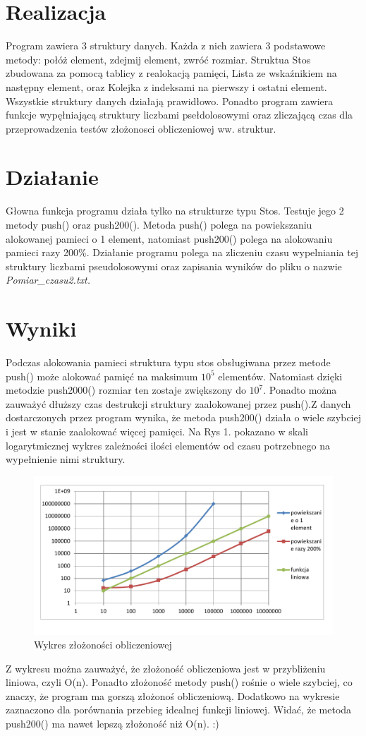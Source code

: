 \documentclass[twoside]{article}
\newcommand{\+}{\discretionary{\mbox{\scriptsize$\hookleftarrow$}}{}{}}
\begin{document}
\section{Realizacja}
Program zawiera 3 struktury danych. Każda z nich zawiera 3 podstawowe metody: połóż element, zdejmij element, zwróć rozmiar. Struktua Stos zbudowana za pomocą tablicy z realokacją pamięci, Lista ze wskaźnikiem na następny element, oraz Kolejka z indeksami na pierwszy i ostatni element. Wszystkie struktury danych działają prawidłowo.
Ponadto program zawiera funkcje wypęłniającą struktury liczbami psełdolosowymi oraz zliczającą czas dla przeprowadzenia testów złożonosci obliczeniowej ww. struktur.
\section{Działanie}
Głowna funkcja programu działa tylko na strukturze typu Stos. Testuje jego 2 metody push() oraz push200(). Metoda push() polega na powiekszaniu alokowanej pamieci o 1 element, natomiast push200() polega na alokowaniu pamieci razy 200\%. Działanie programu polega na zliczeniu czasu wypelniania tej struktury liczbami pseudolosowymi oraz zapisania wyników do pliku o nazwie \textsl{Pomiar\_czasu2.txt.}
\section{Wyniki}
Podczas alokowania pamieci struktura typu stos obsługiwana przez metode push() może alokować pamięć na maksimum $10^{5}$ elementów. Natomiast dzięki metodzie push2000() rozmiar ten zostaje zwiększony do $10^{7}$. Ponadto można zauważyć dłuższy czas destrukcji struktury zaalokowanej przez push().Z danych dostarczonych przez program wynika, że metoda push200() działa o wiele szybciej i jest w stanie zaalokować więcej pamięci. Na Rys 1. pokazano w skali logarytmicznej wykres zależności ilości elementów od czasu potrzebnego na wypełnienie nimi struktury.
\begin{figure}[h!]
\centering
\includegraphics[scale=0.7]{wykres1}
\caption{Wykres złożoności obliczeniowej}
\label{fig:wykres1}
\end{figure}
Z wykresu można zauważyć, że złożoność obliczeniowa jest w przybliżeniu liniowa, czyli O(n). Ponadto złożoność metody push() rośnie o wiele szybciej, co znaczy, że program ma gorszą złożonoś obliczeniową. Dodatkowo na wykresie zaznaczono dla porównania przebieg idealnej funkcji liniowej. Widać, że metoda push200() ma nawet lepszą złożoność niż O(n). :)
\end{document}
